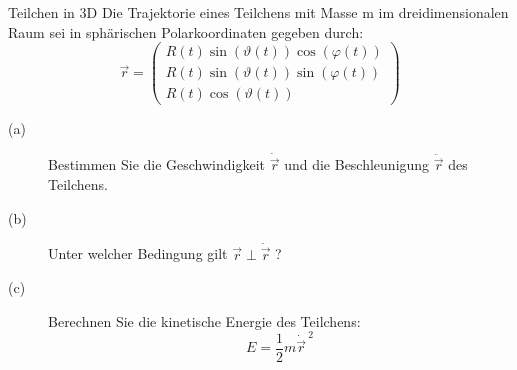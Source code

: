 \setcounter{punkte}{5}
\begin{aufgabe}{Teilchen in 3D}
Die Trajektorie eines Teilchens mit Masse m im dreidimensionalen Raum sei in sphärischen
Polarkoordinaten gegeben durch:
\begin{equation}
  \vec{r} =
  \begin{pmatrix}
      R(t) \sin\!\left(\vartheta(t)\right) \cos\!\left(\varphi(t)\right) \\
      R(t) \sin\!\left(\vartheta(t)\right) \sin\!\left(\varphi(t)\right) \\
      R(t) \cos\!\left(\vartheta(t)\right)
  \end{pmatrix}
  \label{eqn:trajektorie}
\end{equation}
\begin{description}
  \item[(a)] Bestimmen Sie die Geschwindigkeit $\dot{\vec{r}}$ und die Beschleunigung
  $\ddot{\vec{r}}$ des Teilchens.
  \item[(b)] Unter welcher Bedingung gilt $\vec{r} \perp \dot{\vec{r}}$ ?
  \item[(c)] Berechnen Sie die kinetische Energie des Teilchens:
  \begin{equation}
    E = \frac{1}{2} m {\dot{\vec{r}}\,}^2
    \label{eqn:ekin}
  \end{equation}
\end{description}
\end{aufgabe}

%
%
